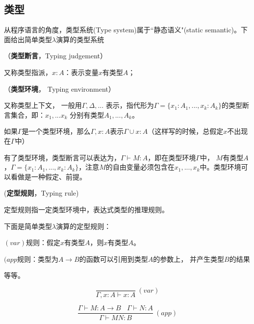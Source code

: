 \subsection{类型}

从程序语言的角度，类型系统(Type system)属于``静态语义"(static semantic)。下面给出简单类型$\lambda$演算的类型系统

\begin{defn}（\textbf{类型断言}，Typing judgement）

又称类型指派，$x:A$：表示变量$x$有类型$A$；
\end{defn}

\begin{defn}（\textbf{类型环境}， Typing environment）

又称类型上下文， 一般用$\Gamma, \Delta,...$ 表示，指代形为$\Gamma = \{x_1:A_1,...,x_k:A_k \}$的类型断言集合，即：$x_1,...x_k$ 分别有类型$A_1,...,A_k$。



\end{defn}

\begin{note}

如果$\Gamma$是一个类型环境，那么$\Gamma, x:A$表示$\Gamma \cup {x:A}$（这样写的时候，总假定$x$不出现在$\Gamma$中）

\end{note}

有了类型环境，类型断言可以表达为，$\Gamma \vdash M:A$，即在类型环境$\Gamma$中， $M$有类型$A$，$\Gamma = \{x_1:A_1,...,x_k:A_k \}$，注意$M$的自由变量必须包含在$x_1, ..., x_k$中。类型环境可以看做是一种假定、前提。


\begin{defn}(\textbf{定型规则}，Typing rule)

定型规则指一定类型环境中，表达式类型的推理规则。

\end{defn}

下面是简单类型$\lambda$演算的定型规则：
\begin{tightenum}
  \item $(var)$规则：假定$x$有类型$A$，则$x$有类型$A$。
  \item $(app$规则：类型为$A \to B$的函数可以引用到类型$A$的参数上， 并产生类型$B$的结果
  \item 等等。
\end{tightenum}

$$\frac {}
       {\Gamma, x:A \vdash x : A} \ (var)$$


$$\frac {\Gamma \vdash M : A \to B \ \ \ \ \Gamma \vdash N : A}
       {\Gamma \vdash M N : B} \ (app)$$


